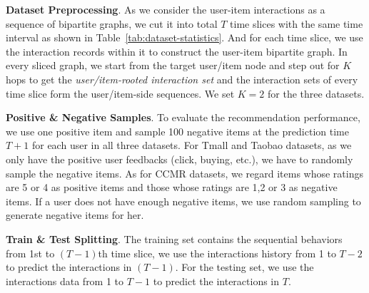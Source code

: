\noindent\textbf{Dataset Preprocessing}.
As we consider the user-item interactions as a sequence of bipartite graphs, we cut it into total $T$ time slices with the same time interval as shown in Table~\ref{tab:dataset-statistics}. And for each time slice, we use the interaction records within it to construct the user-item bipartite graph.
In every sliced graph, we start from the target user/item node and step out for $K$ hops to get the \textit{user/item-rooted interaction set} and the interaction sets of every time slice form the user/item-side sequences. 
We set $K=2$ for the three datasets.

\begin{table}[t]
	\centering
	\caption{The dataset statistics.}\label{tab:dataset-statistics}
\end{table}


\noindent\textbf{Positive \& Negative Samples}.
To evaluate the recommendation performance, we use one positive item and sample 100 negative items at the prediction time $T + 1$ for each user in all three datasets.
For Tmall and Taobao datasets, as we only have the positive user feedbacks (click, buying, etc.), we have to randomly sample the negative items. As for CCMR datasets, we regard items whose ratings are 5 or 4 as positive items and those whose ratings are 1,2 or 3 as negative items. If a user does not have enough negative items, we use random sampling to generate negative items for her.

\noindent\textbf{Train \& Test Splitting}.
The training set contains the sequential behaviors from 1st to $(T-1)$th time slice, we use the interactions history from 1 to $T-2$ to predict the interactions in $(T-1)$. For the testing set, we use the interactions data from 1 to $T-1$ to predict the interactions in $T$.

